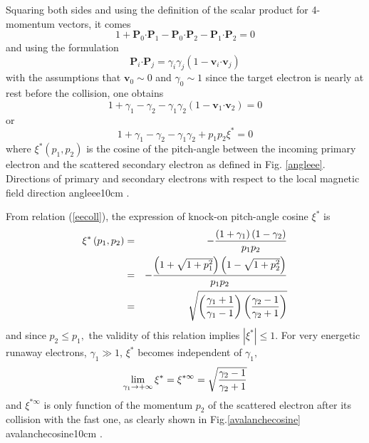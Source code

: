 Squaring both sides and using the definition of the scalar product for
4-momentum vectors, it comes 
\begin{equation}
1+\mathbf{P}_{0}\mathbf{\cdot P}_{1}-\mathbf{P}_{0}\mathbf{\cdot P}_{2}-%
\mathbf{P}_{1}\mathbf{\cdot P}_{2}=0
\end{equation}%
and using the formulation 
\begin{equation}
\mathbf{P}_{i}\mathbf{\cdot P}_{j}=\gamma _{i}\gamma _{j}\left( 1-\mathbf{v}%
_{i}\mathbf{\cdot v}_{j}\right)
\end{equation}%
with the assumptions that $\mathbf{v}_{0}\sim 0$ and $\gamma _{0}\sim 1$
since the target electron is nearly at rest before the collision, one
obtains 
\begin{equation}
1+\gamma _{1}-\gamma _{2}-\gamma _{1}\gamma _{2}\left( 1-\mathbf{v}_{1}%
\mathbf{\cdot v}_{2}\right) =0
\end{equation}%
or 
\begin{equation}
1+\gamma _{1}-\gamma _{2}-\gamma _{1}\gamma _{2}+p_{1}p_{2}\xi ^{\ast }=0
\label{eecoll}
\end{equation}%
where $\xi ^{\ast }\left( p_{1},p_{2}\right) $ is the cosine of the
pitch-angle between the incoming primary electron and the scattered
secondary electron as defined in Fig. \ref{angleee}. 
 {Directions of primary and secondary electrons with respect to the local magnetic field direction} {angleee}{10cm}%
.

From relation (\ref{eecoll}), the expression of knock-on pitch-angle cosine $%
\xi ^{\ast }$ is%
\begin{eqnarray}
\xi ^{\ast }\left( p_{1},p_{2}\right)  &=&-\frac{\left( 1+\gamma _{1}\right)
\left( 1-\gamma _{2}\right) }{p_{1}p_{2}}  \notag \\
&=&-\frac{\left( 1+\sqrt{1+p_{1}^{2}}\right) \left( 1-\sqrt{1+p_{2}^{2}}%
\right) }{p_{1}p_{2}}  \notag \\
&=&\sqrt{\left( \frac{\gamma _{1}+1}{\gamma _{1}-1}\right) \left( \frac{%
\gamma _{2}-1}{\gamma _{2}+1}\right) }  \label{pitchanglerunaway}
\end{eqnarray}%
and since $p_{2}\leq p_{1},$ the validity of this relation implies $%
\left\vert \xi ^{\ast }\right\vert \leq 1.$ For very energetic runaway
electrons, $\gamma _{1}\gg 1$, $\xi ^{\ast }$ becomes independent of $\gamma
_{1},$ 
\begin{equation}
\lim_{\gamma _{1}\rightarrow +\infty }\xi ^{\ast }=\xi ^{\ast \infty }=\sqrt{%
\frac{\gamma _{2}-1}{\gamma _{2}+1}}
\end{equation}%
and $\xi ^{\ast \infty }$ is only function of the momentum $p_{2}$ of the
scattered electron after its collision with the fast one, as clearly shown
in Fig.\ref{avalanchecosine} 
 {avalanchecosine}{10cm}%
.

